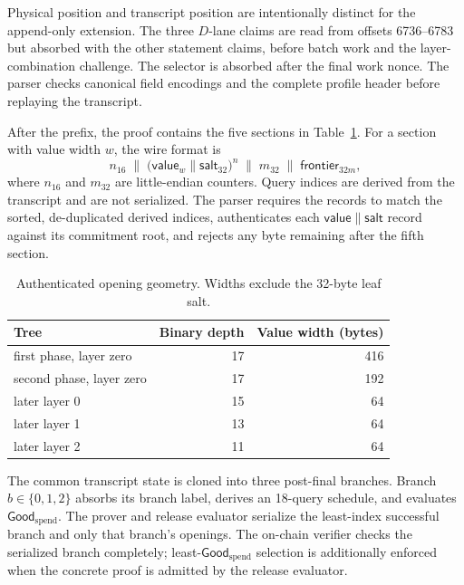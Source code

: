 Physical position and transcript position are intentionally distinct for the
append-only extension.  The three \(D\)-lane claims are read from offsets
6736--6783 but absorbed with the other statement claims, before batch work and
the layer-combination challenge.  The selector is absorbed after the final
work nonce.  The parser checks canonical field encodings and the complete
profile header before replaying the transcript.

After the prefix, the proof contains the five sections in
Table~\ref{tab:opening-geometry}.  For a section with value width \(w\), the
wire format is
\[
  n_{16}\;\mathbin\|\;
  \bigl(\mathsf{value}_{w}\mathbin\|\mathsf{salt}_{32}\bigr)^n
  \;\mathbin\|\;m_{32}\;\mathbin\|\;
  \mathsf{frontier}_{32m},
\]
where \(n_{16}\) and \(m_{32}\) are little-endian counters.  Query indices are
derived from the transcript and are not serialized.  The parser requires the
records to match the sorted, de-duplicated derived indices, authenticates each
\(\mathsf{value}\mathbin\|\mathsf{salt}\) record against its commitment root,
and rejects any byte remaining after the fifth section.

\begin{table}[t]
  \centering
  \small
  \caption{Authenticated opening geometry.  Widths exclude the 32-byte leaf
  salt.}
  \label{tab:opening-geometry}
  \begin{tabular}{l r r}
    \toprule
    Tree & Binary depth & Value width (bytes) \\
    \midrule
    first phase, layer zero  & 17 & 416 \\
    second phase, layer zero & 17 & 192 \\
    later layer 0            & 15 & 64  \\
    later layer 1            & 13 & 64  \\
    later layer 2            & 11 & 64  \\
    \bottomrule
  \end{tabular}
\end{table}

The common transcript state is cloned into three post-final branches.  Branch
\(b\in\{0,1,2\}\) absorbs its branch label, derives an 18-query schedule, and
evaluates \(\mathsf{Good}_{\mathrm{spend}}\).  The prover and release evaluator serialize the
least-index successful branch and only that branch's openings.  The on-chain
verifier checks the serialized branch completely; least-\(\mathsf{Good}_{\mathrm{spend}}\)
selection is additionally enforced when the concrete proof is admitted by the
release evaluator.

